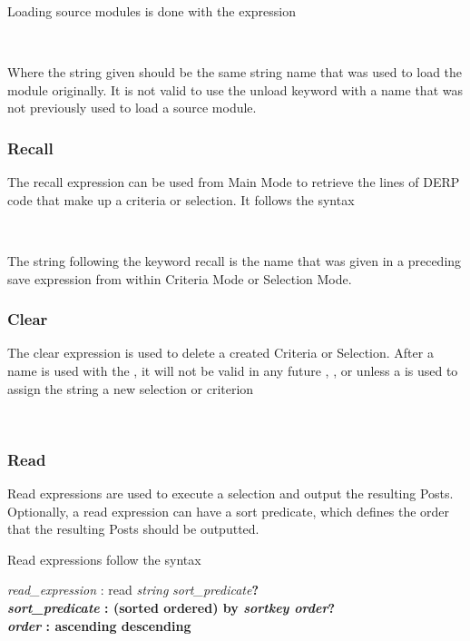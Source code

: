 Loading source modules is done with the expression
\begin{center}
     \\
\end{center}

Where the string given should be the same string name that was used to load the module originally. 
It is not valid to use the unload keyword with a name that was not previously used to load a source module.

\subsubsection{Recall}
The recall expression can be used from Main Mode to retrieve the lines of DERP code that make up a 
criteria or selection. It follows the syntax
\begin{center}
      \\
\end{center}

The string following the keyword recall is the name that was given in a preceding save expression from 
within Criteria Mode or Selection Mode.

\subsubsection{Clear}
The clear expression is used to delete a created Criteria or Selection. After a name is used with the 
, it will not be valid in any future , , or  
unless a  is used to assign the string a new selection or criterion
\begin{center}
      \\
\end{center}

\subsubsection{Read}
Read expressions are used to execute a selection and output the resulting Posts. Optionally, a read 
expression can have a sort predicate, which defines the order that the resulting Posts should be outputted.

Read expressions follow the syntax
\begin{center}
    \textit{read\_expression}  :  read \textit{string} \textit{sort\_predicate}\bf{?}\\
    \textit{sort\_predicate}  :  \bf{(}sorted \bf{\textbar} ordered\bf{)} by \textit{sortkey order}\bf{?}\\
    \textit{order}  :  ascending \bf{\textbar} descending\\
\end{center}

